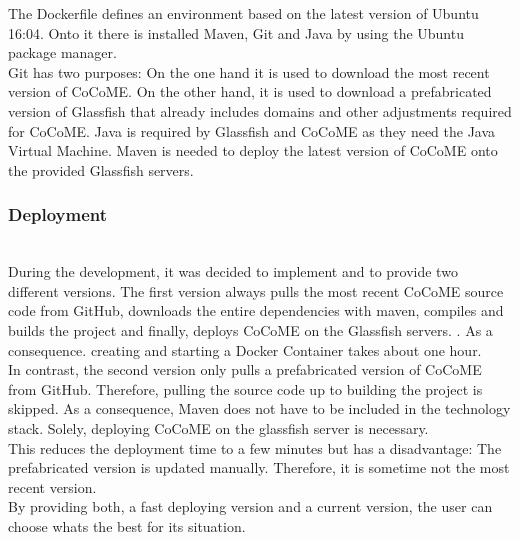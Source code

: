 	The Dockerfile defines an environment based on the latest version of Ubuntu 16:04. Onto it there is installed Maven, Git and Java by using the Ubuntu package manager.\\
	Git has two purposes: On the one hand it is used to download the most recent version of CoCoME.	On the other hand, it is used to download a prefabricated version of Glassfish that already includes domains and other adjustments required for CoCoME. Java is required by Glassfish and CoCoME as they need the Java Virtual Machine. Maven is needed to deploy the latest version of CoCoME onto the provided Glassfish servers.
	
	
	\subsubsection{Deployment}\hfil \\
	During the development, it was decided to implement and to provide two different versions. The first version always pulls the most recent CoCoME source code from GitHub, downloads the entire dependencies with maven, compiles and builds the project and finally, deploys CoCoME on the Glassfish servers. . As a consequence. creating and starting a Docker Container takes about one hour.\\
	In contrast, the second version only  pulls a prefabricated version of CoCoME from GitHub. Therefore, pulling the source code up to building the project is skipped. As a consequence, Maven does not have to be included in the technology stack. Solely, deploying CoCoME on the glassfish server is necessary.\\
	This reduces the deployment time to a few minutes but has a disadvantage: The prefabricated version is updated manually. Therefore, it is sometime not the most recent version.\\
	By providing both, a fast deploying version and a current version, the user can choose whats the best for its situation.
	

